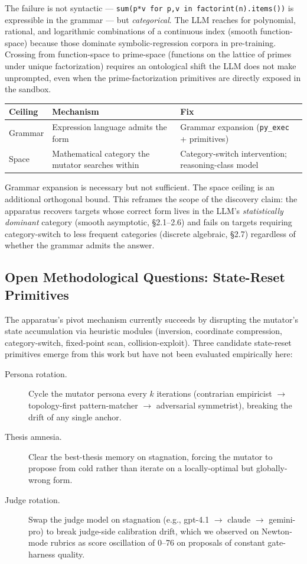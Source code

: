 \documentclass[12pt]{article}
\begin{document}
The failure is not syntactic --- \texttt{sum(p*v for p,v in factorint(n).items())} is expressible in the grammar --- but \emph{categorical}. The LLM reaches for polynomial, rational, and logarithmic combinations of a continuous index (smooth function-space) because those dominate symbolic-regression corpora in pre-training. Crossing from function-space to prime-space (functions on the lattice of primes under unique factorization) requires an ontological shift the LLM does not make unprompted, even when the prime-factorization primitives are directly exposed in the sandbox.

\begin{center}
\small
\begin{tabular}{lll}
\toprule
Ceiling & Mechanism & Fix \\
\midrule
Grammar & Expression language admits the form & Grammar expansion (\texttt{py\_exec} + primitives) \\
Space   & Mathematical category the mutator searches within & Category-switch intervention; reasoning-class model \\
\bottomrule
\end{tabular}
\end{center}

Grammar expansion is necessary but not sufficient. The space ceiling is an additional orthogonal bound. This reframes the scope of the discovery claim: the apparatus recovers targets whose correct form lives in the LLM's \emph{statistically dominant} category (smooth asymptotic, \S2.1--2.6) and fails on targets requiring category-switch to less frequent categories (discrete algebraic, \S2.7) regardless of whether the grammar admits the answer.

\subsection{Open Methodological Questions: State-Reset Primitives}
\label{sec:state-reset}

The apparatus's pivot mechanism currently succeeds by disrupting the mutator's state accumulation via heuristic modules (inversion, coordinate compression, category-switch, fixed-point scan, collision-exploit). Three candidate state-reset primitives emerge from this work but have not been evaluated empirically here:

\begin{description}
\item[Persona rotation.] Cycle the mutator persona every $k$ iterations (contrarian empiricist $\to$ topology-first pattern-matcher $\to$ adversarial symmetrist), breaking the drift of any single anchor.
\item[Thesis amnesia.] Clear the best-thesis memory on stagnation, forcing the mutator to propose from cold rather than iterate on a locally-optimal but globally-wrong form.
\item[Judge rotation.] Swap the judge model on stagnation (e.g., gpt-4.1 $\to$ claude $\to$ gemini-pro) to break judge-side calibration drift, which we observed on Newton-mode rubrics as score oscillation of 0--76 on proposals of constant gate-harness quality.
\end{description}
\end{document}
